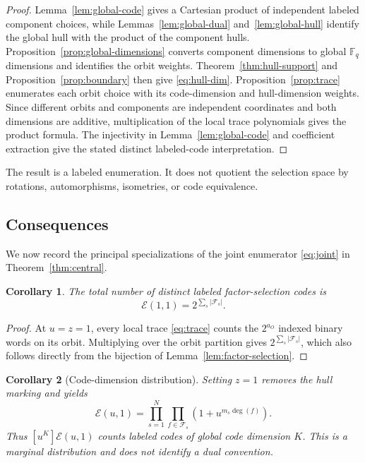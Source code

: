 \documentclass[11pt]{article}
\newcommand{\F}{\mathbb F}
\newcommand{\Fs}{\mathcal F_s}
\newcommand{\Epoly}{\mathscr E}
\theoremstyle{plain}
\newtheorem{corollary}{Corollary}[section]
\theoremstyle{definition}
\theoremstyle{remark}
\begin{document}
\begin{proof}
Lemma~\ref{lem:global-code} gives a Cartesian product of independent labeled component choices, while Lemmas~\ref{lem:global-dual} and~\ref{lem:global-hull} identify the global hull with the product of the component hulls. Proposition~\ref{prop:global-dimensions} converts component dimensions to global $\F_q$ dimensions and identifies the orbit weights. Theorem~\ref{thm:hull-support} and Proposition~\ref{prop:boundary} then give \eqref{eq:hull-dim}. Proposition~\ref{prop:trace} enumerates each orbit choice with its code-dimension and hull-dimension weights. Since different orbits and components are independent coordinates and both dimensions are additive, multiplication of the local trace polynomials gives the product formula. The injectivity in Lemma~\ref{lem:global-code} and coefficient extraction give the stated distinct labeled-code interpretation.
\end{proof}

The result is a labeled enumeration. It does not quotient the selection space by rotations, automorphisms, isometries, or code equivalence.

\subsection{Consequences}

We now record the principal specializations of the joint enumerator \eqref{eq:joint} in Theorem~\ref{thm:central}.

\begin{corollary}\label{cor:total}
The total number of distinct labeled factor-selection codes is
\[
\Epoly(1,1)=2^{\sum_s|\Fs|}.
\]
\end{corollary}

\begin{proof}
At $u=z=1$, every local trace \eqref{eq:trace} counts the $2^{a_O}$ indexed binary words on its orbit. Multiplying over the orbit partition gives $2^{\sum_s|\Fs|}$, which also follows directly from the bijection of Lemma~\ref{lem:factor-selection}.
\end{proof}

\begin{corollary}[Code-dimension distribution]\label{cor:code-dist}
Setting $z=1$ removes the hull marking and yields
\begin{equation}
\Epoly(u,1)=\prod_{s=1}^{N}\prod_{f\in\Fs}
\left(1+u^{m_s\deg(f)}\right).
\end{equation}
Thus $[u^K]\Epoly(u,1)$ counts labeled codes of global code dimension $K$. This is a marginal distribution and does not identify a dual convention.
\end{corollary}
\end{document}
